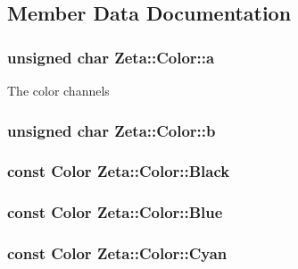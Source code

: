 \subsection{Member Data Documentation}
\hypertarget{classZeta_1_1Color_ad77a91a8d6ba6cab44c9e9bfae669ec0}{
\subsubsection[{a}]{\setlength{\rightskip}{0pt plus 5cm}unsigned char Zeta\+::\+Color\+::a}}\label{classZeta_1_1Color_ad77a91a8d6ba6cab44c9e9bfae669ec0}
The color channels \hypertarget{classZeta_1_1Color_aadf5ef88938d4df94d82e00052592338}{
\subsubsection[{b}]{\setlength{\rightskip}{0pt plus 5cm}unsigned char Zeta\+::\+Color\+::b}}\label{classZeta_1_1Color_aadf5ef88938d4df94d82e00052592338}
\hypertarget{classZeta_1_1Color_a4a6a583730b56c02ac6eac1f75d29895}{
\subsubsection[{Black}]{\setlength{\rightskip}{0pt plus 5cm}const {\bf Color} Zeta\+::\+Color\+::\+Black\hspace{0.3cm}{\ttfamily [static]}}}\label{classZeta_1_1Color_a4a6a583730b56c02ac6eac1f75d29895}
\hypertarget{classZeta_1_1Color_afd1ab70350452370df5d4588ae84282b}{
\subsubsection[{Blue}]{\setlength{\rightskip}{0pt plus 5cm}const {\bf Color} Zeta\+::\+Color\+::\+Blue\hspace{0.3cm}{\ttfamily [static]}}}\label{classZeta_1_1Color_afd1ab70350452370df5d4588ae84282b}
\hypertarget{classZeta_1_1Color_a59a0124f868c4d4e93dd11d3c3cb560c}{
\subsubsection[{Cyan}]{\setlength{\rightskip}{0pt plus 5cm}const {\bf Color} Zeta\+::\+Color\+::\+Cyan\hspace{0.3cm}{\ttfamily [static]}}}\label{classZeta_1_1Color_a59a0124f868c4d4e93dd11d3c3cb560c}
